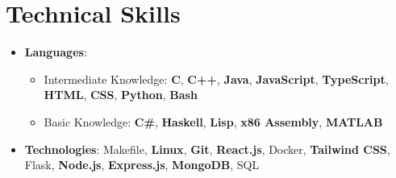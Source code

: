 \section{Technical Skills}
\begin{itemize}[leftmargin=0.15in, label={}, topsep=0.25ex, parsep=0.25ex]
    \small
    \item \textbf{Languages}: 
    \begin{itemize}[topsep=0.25ex, parsep=0.25ex]
        \item Intermediate Knowledge: \textbf{C}, \textbf{C++}, \textbf{Java}, \textbf{JavaScript}, \textbf{TypeScript}, \textbf{HTML}, \textbf{CSS}, \textbf{Python}, \textbf{Bash}
        \item Basic Knowledge: \textbf{C\#}, \textbf{Haskell}, \textbf{Lisp}, \textbf{x86 Assembly}, \textbf{MATLAB}
    \end{itemize}
    \item \textbf{Technologies}: Makefile, \textbf{Linux}, \textbf{Git}, \textbf{React.js}, Docker, \textbf{Tailwind CSS}, Flask, \textbf{Node.js}, \textbf{Express.js}, \textbf{MongoDB}, SQL
\end{itemize}
